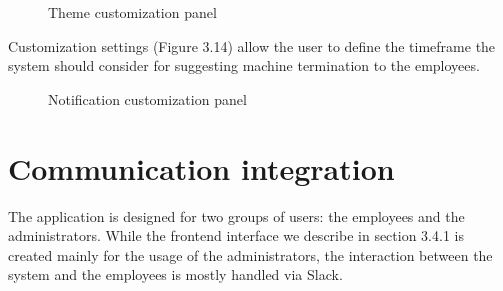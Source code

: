 \documentclass[licencjacka,en]{thesisclass}
\begin{document}
    \begin{figure}[H]
      \caption{Theme customization panel\label{fig:scr-theme}}
    \end{figure}

    Customization settings (Figure 3.14) allow the user to define the timeframe
    the system should consider for suggesting machine termination
    to the employees.

    \begin{figure}[H]
      \caption{Notification customization panel\label{fig:scr-notify}}
    \end{figure}


    \section{Communication integration}
    The application is designed for two groups of users: the employees and the administrators.
    While the frontend interface we describe in section 3.4.1 is created mainly for the usage
    of the administrators, the interaction between the system and the employees is mostly
    handled via Slack.
\end{document}
